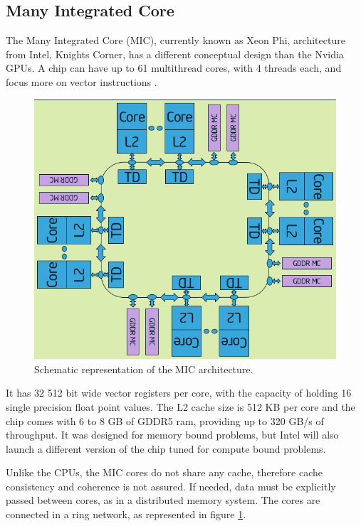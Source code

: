 \subsection{\intel Many Integrated Core}

The \intel Many Integrated Core (MIC), currently known as \intel Xeon Phi, architecture from Intel, Knights Corner, has a different conceptual design than the Nvidia GPUs. A chip can have up to 61 multithread cores, with 4 threads each, and focus more on vector instructions \cite{Intel:MIC:Elgar}. 

\begin{figure}[!htp]
	\begin{center}
		\includegraphics[scale=0.5]{../../common/img/mic_arch.png}
		\caption{Schematic representation of the \intel MIC architecture.}
		\label{fig:mic}
	\end{center}
\end{figure}

It has 32 512 bit wide vector registers per core, with the capacity of holding 16 single precision float point values. The L2 cache size is 512 KB per core and the chip comes with 6 to 8 GB of GDDR5 ram, providing up to 320 GB/s of throughput. It was designed for memory bound problems, but Intel will also launch a different version of the chip tuned for compute bound problems.

Unlike the CPUs, the MIC cores do not share any cache, therefore cache consistency and coherence is not assured. If needed, data must be explicitly passed between cores, as in a distributed memory system. The cores are connected in a ring network, as represented in figure \ref{fig:mic}.

